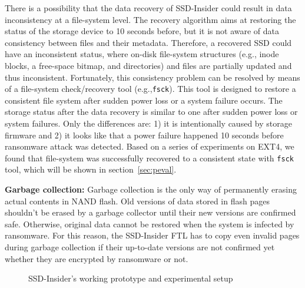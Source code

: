 \documentclass[conference]{IEEEtran}
\newcommand{\eg}{e.g.,\xspace}
\newcommand{\ours}{SSD-Insider}
\begin{document}
There is a possibility that the data recovery of \ours{} could
result in data inconsistency at a file-system level.  The recovery
algorithm aims at restoring the status of the storage device to 10
seconds before, but it is not aware of data consistency between files
and their metadata.  Therefore, a recovered SSD could have an
inconsistent status, where on-disk file-system structures (\eg
inode blocks, a free-space bitmap, and directories) and files are
partially updated and thus inconsistent.  Fortunately, this
consistency problem can be resolved by means of a file-system
check/recovery tool (\eg \texttt{fsck}).  This tool is designed
to restore a consistent file system after sudden power loss or a
system failure occurs.  The storage status after the data recovery
is similar to one after sudden power loss or system failures. Only
the differences are: 1) it is intentionally caused by storage
firmware and 2) it looks like that a power failure happened 10
seconds before ransomware attack was detected.  Based on a series
of experiments on EXT4, we found that file-system was successfully
recovered to a consistent state with \texttt{fsck} tool, 
which will be shown in section~\ref{sec:peval}.

{\bf Garbage collection:} 
Garbage collection is the only way of permanently erasing actual
contents in NAND flash. Old versions of data stored in
flash pages shouldn't be erased by a garbage collector until their
new versions are confirmed safe. Otherwise, original data cannot be
restored when the system is infected by ransomware.  For this
reason, the \ours{} FTL has to copy even invalid pages during
garbage collection if their up-to-date versions are not confirmed
yet whether they are encrypted by ransomware or not. 

\begin{figure}[t]
\centering
{}\hfill
{}\hfill
{}
\caption{\ours{}'s working prototype and experimental setup}
\label{fig:platform}
\end{figure}
\end{document}
